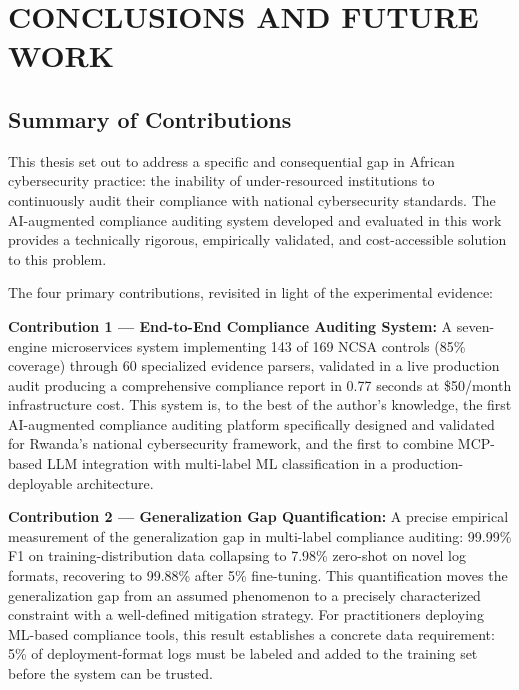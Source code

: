 \documentclass[12pt,oneside]{report}
\begin{document}
\chapter{CONCLUSIONS AND FUTURE WORK}

\section{Summary of Contributions}

This thesis set out to address a specific and consequential gap in African cybersecurity practice: the inability of under-resourced institutions to continuously audit their compliance with national cybersecurity standards. The AI-augmented compliance auditing system developed and evaluated in this work provides a technically rigorous, empirically validated, and cost-accessible solution to this problem.

The four primary contributions, revisited in light of the experimental evidence:

\textbf{Contribution 1 — End-to-End Compliance Auditing System:} A seven-engine microservices system implementing 143 of 169 NCSA controls (85\% coverage) through 60 specialized evidence parsers, validated in a live production audit producing a comprehensive compliance report in 0.77 seconds at \$50/month infrastructure cost. This system is, to the best of the author's knowledge, the first AI-augmented compliance auditing platform specifically designed and validated for Rwanda's national cybersecurity framework, and the first to combine MCP-based LLM integration with multi-label ML classification in a production-deployable architecture.

\textbf{Contribution 2 — Generalization Gap Quantification:} A precise empirical measurement of the generalization gap in multi-label compliance auditing: 99.99\% F1 on training-distribution data collapsing to 7.98\% zero-shot on novel log formats, recovering to 99.88\% after 5\% fine-tuning. This quantification moves the generalization gap from an assumed phenomenon to a precisely characterized constraint with a well-defined mitigation strategy. For practitioners deploying ML-based compliance tools, this result establishes a concrete data requirement: 5\% of deployment-format logs must be labeled and added to the training set before the system can be trusted.
\end{document}
